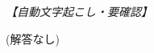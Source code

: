 \documentclass[../../main.tex]{subfiles}
\begin{document}
\begin{flushright}
  \footnotesize\textit{【自動文字起こし・要確認】}
\end{flushright}

(解答なし)
\end{document}
